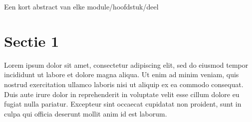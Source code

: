 
\begin{samenvatting}
Een kort abstract van elke module/hoofdstuk/deel
\end{samenvatting}
%

\section{Sectie 1}
\label{sec:Sectie 1}
%
Lorem ipsum dolor sit amet, consectetur adipiscing elit, sed do eiusmod tempor incididunt ut labore et dolore magna aliqua. Ut enim ad minim veniam, quis nostrud exercitation ullamco laboris nisi ut aliquip ex ea commodo consequat. Duis aute irure dolor in reprehenderit in voluptate velit esse cillum dolore eu fugiat nulla pariatur. Excepteur sint occaecat cupidatat non proident, sunt in culpa qui officia deserunt mollit anim id est laborum.
%
%
